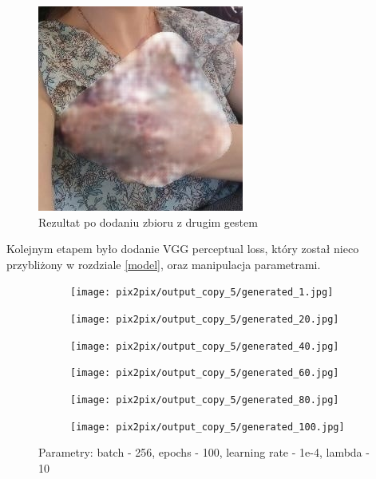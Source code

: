 \documentclass[12pt]{article}
\begin{document}
\begin{sloppypar}
{{    \begin{figure}[H]
      \centering
      \includegraphics{pix2pix/a7c3c2bf-fdaf-47a4-a976-280a1a4ad3dc.jpg}
      \caption{Rezultat po dodaniu zbioru z drugim gestem}
    \end{figure}
    Kolejnym etapem było dodanie VGG perceptual loss, który został nieco przybliżony w rozdziale \ref{model}, oraz manipulacja parametrami. 
    \begin{figure}[H]
      \begin{subfigure}{.5\textwidth}
        \centering
        \texttt{[image: pix2pix/output\_copy\_5/generated\_1.jpg]}
      \end{subfigure}%
      \begin{subfigure}{.5\textwidth}
        \centering
        \texttt{[image: pix2pix/output\_copy\_5/generated\_20.jpg]}
      \end{subfigure}
      \begin{subfigure}{.5\textwidth}
        \centering
        \texttt{[image: pix2pix/output\_copy\_5/generated\_40.jpg]}
      \end{subfigure}
      \begin{subfigure}{.5\textwidth}
        \centering
        \texttt{[image: pix2pix/output\_copy\_5/generated\_60.jpg]}
      \end{subfigure}
      \begin{subfigure}{.5\textwidth}
        \centering
        \texttt{[image: pix2pix/output\_copy\_5/generated\_80.jpg]}
      \end{subfigure}
      \begin{subfigure}{.5\textwidth}
        \centering
        \texttt{[image: pix2pix/output\_copy\_5/generated\_100.jpg]}
      \end{subfigure}
      \caption{Parametry: batch - 256, epochs - 100, learning rate - 1e-4, lambda - 10}
    \end{figure}
}}
\end{sloppypar}
\end{document}
